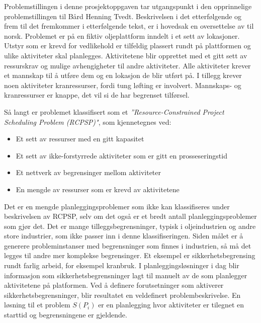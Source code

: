 Problemstillingen i denne prosjektoppgaven tar utgangspunkt i den opprinnelige problemstillingen til Bård Henning Tvedt. Beskrivelsen i det etterfølgende og frem til det fremkommer i etterfølgende tekst, er i hovedsak en oversettelse av \cite{tvedtbezem} til norsk. Problemet er på en fiktiv oljeplattform inndelt i et sett av lokasjoner. Utstyr som er krevd for vedlikehold er tilfeldig plassert rundt på plattformen og ulike aktiviteter skal planlegges. Aktivitetene blir opprettet med et gitt sett av ressurskrav og mulige avhengigheter til andre aktiviteter. Alle aktiviteter krever et mannskap til å utføre dem og en lokasjon de blir utført på. I tillegg krever noen aktiviteter kranressurser, fordi tung løfting er involvert. Mannskaps- og kranressurser er knappe, det vil si de har begrenset tilførsel.

Så langt er problemet klassifisert som et \textit{''Resource-Constrained Project Scheduling Problem (RCPSP)"}\cite{RcpspPaperSchutt}, som kjennetegnes ved:
\begin{itemize}
\item Et sett av ressurser med en gitt kapasitet
\item Et sett av ikke-forstyrrede aktiviteter som er gitt en prosseseringstid
\item Et nettverk av begrensinger mellom aktiviteter
\item En mengde av ressurser som er krevd av aktivitetene
\end{itemize}

Det er en mengde planleggingsproblemer som ikke kan klassifiseres under beskrivelsen av RCPSP, selv om det også er et bredt antall planleggingsproblemer som gjør det. Det er mange tilleggsbegrensninger, typisk i oljeindustrien og andre store industrier, som ikke passer inn i denne klassifiseringen. Siden målet er å generere probleminstanser med begrensninger som finnes i industrien, så må det legges til andre mer komplekse begrensinger. Et eksempel  er sikkerhetsbegrensing rundt farlig arbeid, for eksempel kranbruk. I planleggingsløsninger i dag blir informasjon som sikkerhetsbegrensninger lagt til manuelt av de som planlegger aktivitetene på platformen. Ved å definere forutsetninger som aktiverer sikkerhetsbegrensninger, blir resultatet en veldefinert problembeskrivelse. En løsning til et problem $ S(P_{i}) $ er en planlegging hvor aktiviteter er tilegnet en starttid og begrensningene er gjeldende.


